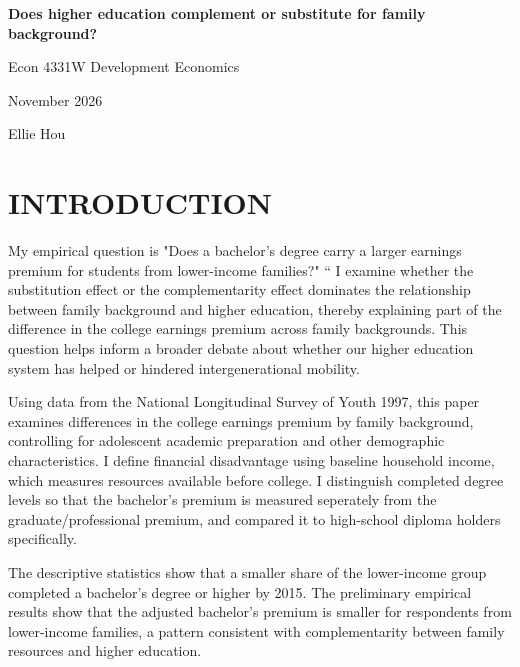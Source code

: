 \documentclass[12pt,letterpaper]{article}
\begin{document}
\hypersetup{pageanchor=false}
\begin{titlepage}
    \centering
    \singlespacing
    \vspace*{1.5in}

    {\bfseries Does higher education complement or substitute for family background?\par}
    \vspace{\baselineskip}
    Econ 4331W Development Economics\par
    November 2026\par
    Ellie Hou\par

    \vfill
\end{titlepage}
\hypersetup{pageanchor=true}

\singlespacing
\raggedright

\section*{INTRODUCTION}
My empirical question is "Does a bachelor's degree carry a larger earnings premium for students 
from lower-income families?" “ I examine whether the substitution effect or the complementarity 
effect dominates the relationship between family background and higher education, thereby explaining
part of the difference in the college earnings premium across family backgrounds. 
This question helps inform a broader debate about whether our higher education system 
has helped or hindered intergenerational mobility. \newline

Using data from the National Longitudinal Survey of Youth 1997, this paper examines differences
in the college earnings premium by family background, controlling for adolescent academic
preparation and other demographic characteristics. I define financial disadvantage using 
baseline household income, which measures resources available before college. 
I distinguish completed degree levels so that the bachelor's premium is measured seperately 
from the graduate/professional premium, and compared it to high-school diploma holders specifically.\newline

The descriptive statistics show that a smaller share of the lower-income group completed
a bachelor's degree or higher by 2015. The preliminary empirical results show that the 
adjusted bachelor's premium is smaller for respondents from lower-income families, a pattern 
consistent with complementarity between family resources and higher education.\newline
\end{document}
